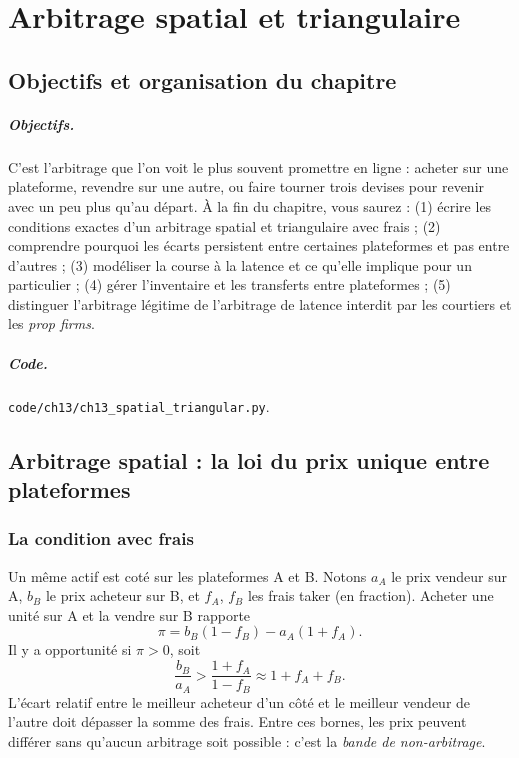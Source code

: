 \chapter{Arbitrage spatial et triangulaire}
\label{ch:13}

\section{Objectifs et organisation du chapitre}

\paragraph{Objectifs.} C'est l'arbitrage que l'on voit le plus souvent promettre en ligne : acheter sur une plateforme, revendre sur une autre, ou faire tourner trois devises pour revenir avec un peu plus qu'au départ. À la fin du chapitre, vous saurez : (1) écrire les conditions exactes d'un arbitrage spatial et triangulaire avec frais ; (2) comprendre pourquoi les écarts persistent entre certaines plateformes et pas entre d'autres \citep{makarov2020} ; (3) modéliser la course à la latence et ce qu'elle implique pour un particulier \citep{budish2015} ; (4) gérer l'inventaire et les transferts entre plateformes ; (5) distinguer l'arbitrage légitime de l'arbitrage de latence interdit par les courtiers et les \emph{prop firms}.

\paragraph{Code.} \texttt{code/ch13/ch13\_spatial\_triangular.py}.

\section{Arbitrage spatial : la loi du prix unique entre plateformes}

\subsection{La condition avec frais}

Un même actif est coté sur les plateformes A et B. Notons $a_A$ le prix vendeur sur A, $b_B$ le prix acheteur sur B, et $f_A$, $f_B$ les frais taker (en fraction). Acheter une unité sur A et la vendre sur B rapporte
\[
\pi = b_B(1-f_B) - a_A(1+f_A).
\]
Il y a opportunité si $\pi>0$, soit
\[
\frac{b_B}{a_A} > \frac{1+f_A}{1-f_B} \approx 1 + f_A + f_B.
\]
L'écart relatif entre le meilleur acheteur d'un côté et le meilleur vendeur de l'autre doit dépasser la somme des frais. Entre ces bornes, les prix peuvent différer sans qu'aucun arbitrage soit possible : c'est la \emph{bande de non-arbitrage}.

